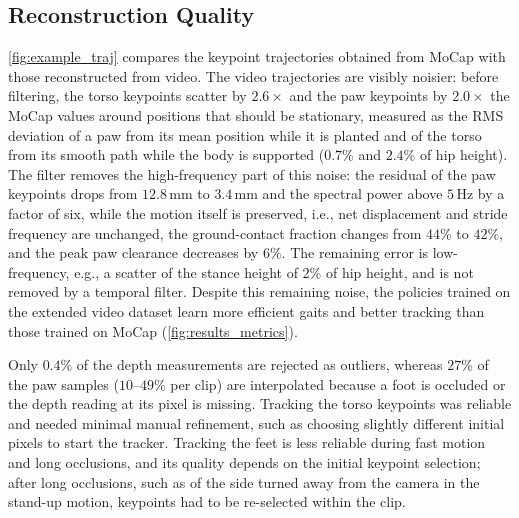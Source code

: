 \subsection{Reconstruction Quality}

\autoref{fig:example_traj} compares the keypoint trajectories obtained from MoCap with those reconstructed from video. The video trajectories are visibly noisier: before filtering, the torso keypoints scatter by $2.6\times$ and the paw keypoints by $2.0\times$ the MoCap values around positions that should be stationary, measured as the RMS deviation of a paw from its mean position while it is planted and of the torso from its smooth path while the body is supported ($0.7\%$ and $2.4\%$ of hip height). The filter removes the high-frequency part of this noise: the residual of the paw keypoints drops from $12.8\,$mm to $3.4\,$mm and the spectral power above $5\,$Hz by a factor of six, while the motion itself is preserved, i.e., net displacement and stride frequency are unchanged, the ground-contact fraction changes from $44\%$ to $42\%$, and the peak paw clearance decreases by $6\%$. The remaining error is low-frequency, e.g., a scatter of the stance height of $2\%$ of hip height, and is not removed by a temporal filter. Despite this remaining noise, the policies trained on the extended video dataset learn more efficient gaits and better tracking than those trained on MoCap (\autoref{fig:results_metrics}).

Only $0.4\%$ of the depth measurements are rejected as outliers, whereas $27\%$ of the paw samples ($10$--$49\%$ per clip) are interpolated because a foot is occluded or the depth reading at its pixel is missing. Tracking the torso keypoints was reliable and needed minimal manual refinement, such as choosing slightly different initial pixels to start the tracker. Tracking the feet is less reliable during fast motion and long occlusions, and its quality depends on the initial keypoint selection; after long occlusions, such as of the side turned away from the camera in the stand-up motion, keypoints had to be re-selected within the clip.
